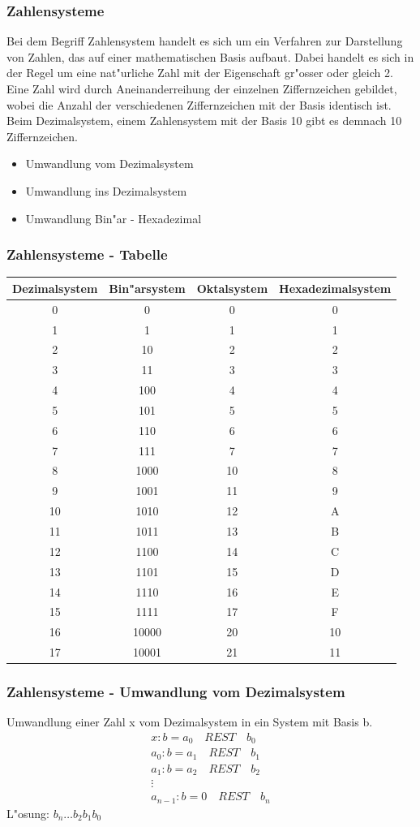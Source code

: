 \documentclass{beamer}
\begin{document}
\frame
{
	\frametitle{Zahlensysteme}
	{\small Bei dem Begriff Zahlensystem handelt es sich um ein Verfahren zur Darstellung von Zahlen,
	das auf einer mathematischen Basis aufbaut. Dabei handelt es sich in der Regel um eine
	nat"urliche Zahl mit der Eigenschaft gr"osser oder gleich 2. Eine Zahl wird durch
	Aneinanderreihung der einzelnen Ziffernzeichen gebildet, wobei die Anzahl der verschiedenen
	Ziffernzeichen mit der Basis identisch ist. Beim Dezimalsystem, einem Zahlensystem mit der
	Basis 10 gibt es demnach 10 Ziffernzeichen.}
	
	\begin{itemize}
	\item Umwandlung vom Dezimalsystem
	\item Umwandlung ins Dezimalsystem
	\item Umwandlung Bin"ar - Hexadezimal
	\end{itemize}
}

\frame
{
	\frametitle{Zahlensysteme - Tabelle}
	{\tiny
	\begin{tabular}{c|c|c|c}
	Dezimalsystem & Bin"arsystem & Oktalsystem & Hexadezimalsystem \\
	\hline
	0 & 0 & 0 & 0 \\
	1 & 1 & 1 & 1 \\
	2 & 10 & 2 & 2 \\
	3 & 11 & 3 & 3 \\
	4 & 100 & 4 & 4 \\
	5 & 101 & 5 & 5 \\
	6 & 110 & 6 & 6 \\
	7 & 111 & 7 & 7 \\
	8 & 1000 & 10 & 8 \\
	9 & 1001 & 11 & 9 \\
	10 & 1010 & 12 & A \\
	11 & 1011 & 13 & B \\
	12 & 1100 & 14 & C \\
	13 & 1101 & 15 & D \\
	14 & 1110 & 16 & E \\
	15 & 1111 & 17 & F \\
	16 & 10000 & 20 & 10 \\
	17 & 10001 & 21 & 11 \\
	\end{tabular}
	}
}

\frame
{
	\frametitle{Zahlensysteme - Umwandlung vom Dezimalsystem}
	Umwandlung einer Zahl x vom Dezimalsystem in ein System mit Basis b.\\
	\vspace{3mm}
	\begin{displaymath}
	\begin{array}{ll}
	x : b = a_0 \quad REST \quad b_0 \\
	a_0 : b = a_1 \quad REST \quad b_1 \\
	a_1 : b = a_2 \quad REST \quad b_2 \\
	\vdots \\
	a_{n-1} : b = 0 \quad REST \quad b_n
	\end{array}
	\end{displaymath}
	\vspace{3mm}
	L"osung: $b_n \dots b_2 b_1 b_0$	
}
\end{document}
